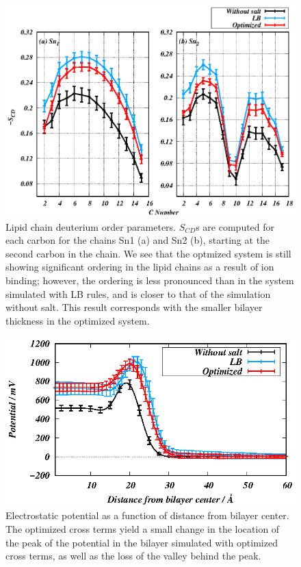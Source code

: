 \documentclass[journal=langd5,manuscript=article]{achemso}
\begin{document}
\begin{figure}[htb]
    \caption{ Lipid chain deuterium order parameters. $S_{CD}$s are computed for each carbon
        for the chains Sn1 (a) and Sn2 (b), starting at the second carbon in the chain. We see that the optmized system is still showing significant ordering in the lipid
    chains as a result of ion binding; however, the ordering is less pronounced than in the system simulated with LB rules, 
    and is closer to that of the simulation without salt. This
result corresponds with the smaller bilayer thickness in the optimized system.
}
    \label{fig:op}
    \includegraphics[width=\textwidth,trim=-3cm 0 0 0]{figure_s2.eps}
\end{figure}
\clearpage
\begin{figure}
    \caption{ Electrostatic potential as a function of distance from bilayer center. The optimized
cross terms yield a small change in the location of the peak of the potential in the
bilayer simulated with optimized cross terms, as well as the loss of the valley behind the peak.
}
    \label{fig:potential}
    \includegraphics[width=\textwidth,trim=-3cm 0 0 0]{figure_s3.eps}
\end{figure}
\end{document}
